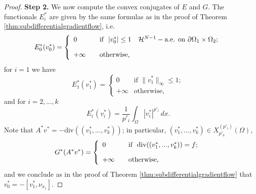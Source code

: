 \documentclass[reqno,12pt]{amsart}
\numberwithin{equation}{section}
\newcommand{\twopartdef}[4]
{
	\left\{
	\begin{array}{ll}
		#1 & #2 \\
		#3 & #4
	\end{array}
	\right.
}
\begin{document}
\begin{proof}
{\flushleft \bf Step 2.} We now compute the convex conjugates of $E$ and $G$. The functionals $E_i^*$ are given by the same formulas as in the proof of Theorem \ref{thm:subdifferentialgradientflow}, i.e.
\begin{equation}
E_0^*(v_0^*) = \left\{ \begin{array}{ll} \displaystyle  0 \quad &\hbox{if} \ \  |v_0^*| \leq 1 \quad \mathcal{H}^{N-1}-\mbox{a.e. on } \partial\Omega_1 \times \Omega_2; \\[10pt] +\infty \quad &\hbox{otherwise,}   \end{array}  \right.
\end{equation}
for $i = 1$ we have
$$E_1^*(v_1^*) = \twopartdef{0}{\mbox{if } \| v_1^* \|_\infty \leq 1;}{+\infty}{\mbox{otherwise,}} $$
and for $i = 2, ..., k$ 
$$ E_i^*(v_i^*) = \frac{1}{p'_i} \int_\Omega |v_i^*|^{p'_i} \, dx.$$
Note that $A^* v^* =- \mathrm{div}((v_1^*, ..., v_k^*))$; in particular, $(v_1^*, ..., v_k^*) \in X_{p'_k}^{(p'_i)}(\Omega)$,
$$G^*(A^* v^*) = \left\{ \begin{array}{ll} \displaystyle  0 \quad &\hbox{if} \ \  \mathrm{div}((v_1^*, ..., v_k^*)) = f; \\[10pt] +\infty \quad &\hbox{otherwise,}   \end{array}  \right. $$
and we conclude as in the proof of Theorem \ref{thm:subdifferentialgradientflow} that $v_0^* = - [v_1^*, \nu_{x_1}]$.


\end{proof}
\end{document}
